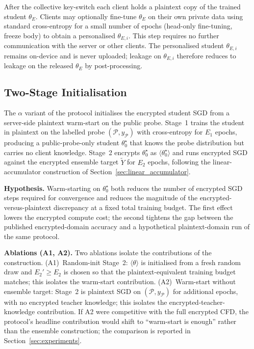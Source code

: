 After the collective key-switch each client holds a plaintext copy of the trained student $\theta_E$. Clients may optionally fine-tune $\theta_E$ on their own private data using standard cross-entropy for a small number of epochs (head-only fine-tuning, freeze body) to obtain a personalised $\theta_{E,i}$. This step requires no further communication with the server or other clients. The personalised student $\theta_{E,i}$ remains on-device and is never uploaded; leakage on $\theta_{E,i}$ therefore reduces to leakage on the released $\theta_E$ by post-processing.


\subsection{Two-Stage Initialisation}
\label{sec:twostage_init}

The $\alpha$ variant of the protocol initialises the encrypted student SGD from a server-side plaintext warm-start on the public probe. Stage~1 trains the student in plaintext on the labelled probe $(\mathcal{P}, y_{\mathcal{P}})$ with cross-entropy for $E_1$ epochs, producing a public-probe-only student $\theta_0^\star$ that knows the probe distribution but carries no client knowledge. Stage~2 encrypts $\theta_0^\star$ as $\langle\theta_0^\star\rangle$ and runs encrypted SGD against the encrypted ensemble target $\widetilde Y$ for $E_2$ epochs, following the linear-accumulator construction of Section~\ref{sec:linear_accumulator}.

\par\noindent\textbf{Hypothesis.} Warm-starting on $\theta_0^\star$ both reduces the number of encrypted SGD steps required for convergence and reduces the magnitude of the encrypted-versus-plaintext discrepancy at a fixed total training budget. The first effect lowers the encrypted compute cost; the second tightens the gap between the published encrypted-domain accuracy and a hypothetical plaintext-domain run of the same protocol.

\par\noindent\textbf{Ablations (A1, A2).} Two ablations isolate the contributions of the construction. (A1)~Random-init Stage~2: $\langle\theta\rangle$ is initialised from a fresh random draw and $E_2'\geq E_2$ is chosen so that the plaintext-equivalent training budget matches; this isolates the warm-start contribution. (A2)~Warm-start without ensemble target: Stage~2 is plaintext SGD on $(\mathcal P, y_{\mathcal P})$ for additional epochs, with no encrypted teacher knowledge; this isolates the encrypted-teacher-knowledge contribution. If A2 were competitive with the full encrypted CFD, the protocol's headline contribution would shift to ``warm-start is enough'' rather than the ensemble construction; the comparison is reported in Section~\ref{sec:experiments}.


